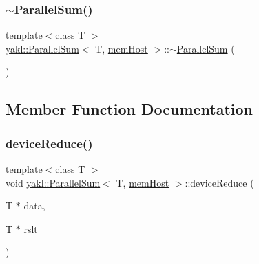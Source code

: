 \mbox{\label{classyakl_1_1ParallelSum_3_01T_00_01memHost_01_4_a8a6b2140b25f36f8919c19c5d1682786}} 
\subsubsection{\texorpdfstring{$\sim$\+Parallel\+Sum()}{~ParallelSum()}}
{\footnotesize\ttfamily template$<$class T $>$ \\
\hyperlink{classyakl_1_1ParallelSum}{yakl\+::\+Parallel\+Sum}$<$ T, \hyperlink{namespaceyakl_aae8a8c910fec7cef7db68c9658c16405}{mem\+Host} $>$\+::$\sim$\hyperlink{classyakl_1_1ParallelSum}{Parallel\+Sum} (\begin{DoxyParamCaption}{ }\end{DoxyParamCaption})\hspace{0.3cm}{\ttfamily [inline]}}



\subsection{Member Function Documentation}
\mbox{\label{classyakl_1_1ParallelSum_3_01T_00_01memHost_01_4_a5199a372d9078c00c913c70a40935dde}} 
\subsubsection{\texorpdfstring{device\+Reduce()}{deviceReduce()}}
{\footnotesize\ttfamily template$<$class T $>$ \\
void \hyperlink{classyakl_1_1ParallelSum}{yakl\+::\+Parallel\+Sum}$<$ T, \hyperlink{namespaceyakl_aae8a8c910fec7cef7db68c9658c16405}{mem\+Host} $>$\+::device\+Reduce (\begin{DoxyParamCaption}\item[{T $\ast$}]{data,  }\item[{T $\ast$}]{rslt }\end{DoxyParamCaption})\hspace{0.3cm}{\ttfamily [inline]}}

